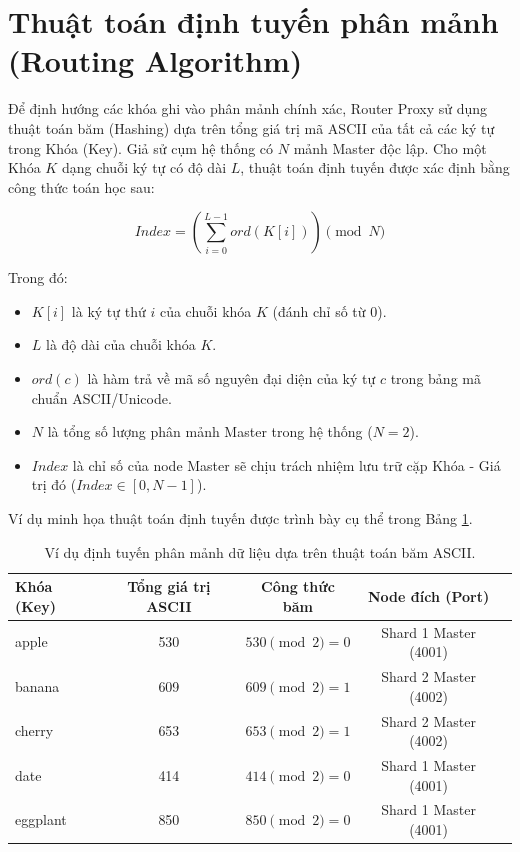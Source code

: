 \documentclass[12pt,a4paper]{report}
\begin{document}
\section{Thuật toán định tuyến phân mảnh (Routing Algorithm)}
Để định hướng các khóa ghi vào phân mảnh chính xác, Router Proxy sử dụng thuật toán băm (Hashing) dựa trên tổng giá trị mã ASCII của tất cả các ký tự trong Khóa (Key).
Giả sử cụm hệ thống có $N$ mảnh Master độc lập. Cho một Khóa $K$ dạng chuỗi ký tự có độ dài $L$, thuật toán định tuyến được xác định bằng công thức toán học sau:

\begin{equation}
    Index = \left( \sum_{i=0}^{L-1} ord(K[i]) \right) \pmod{N}
\end{equation}

Trong đó:
\begin{itemize}
    \item $K[i]$ là ký tự thứ $i$ của chuỗi khóa $K$ (đánh chỉ số từ 0).
    \item $L$ là độ dài của chuỗi khóa $K$.
    \item $ord(c)$ là hàm trả về mã số nguyên đại diện của ký tự $c$ trong bảng mã chuẩn ASCII/Unicode.
    \item $N$ là tổng số lượng phân mảnh Master trong hệ thống ($N = 2$).
    \item $Index$ là chỉ số của node Master sẽ chịu trách nhiệm lưu trữ cặp Khóa - Giá trị đó ($Index \in [0, N-1]$).
\end{itemize}

Ví dụ minh họa thuật toán định tuyến được trình bày cụ thể trong Bảng \ref{tab:sharding_example}.

\begin{table}[h]
    \centering
    \caption{Ví dụ định tuyến phân mảnh dữ liệu dựa trên thuật toán băm ASCII.}
    \label{tab:sharding_example}
    \begin{tabular}{lcccc}
        \toprule
        \textbf{Khóa (Key)} & \textbf{Tổng giá trị ASCII} & \textbf{Công thức băm} & \textbf{Node đích (Port)} \\
        \midrule
        apple & 530 & $530 \pmod{2} = 0$ & Shard 1 Master (4001) \\
        banana & 609 & $609 \pmod{2} = 1$ & Shard 2 Master (4002) \\
        cherry & 653 & $653 \pmod{2} = 1$ & Shard 2 Master (4002) \\
        date & 414 & $414 \pmod{2} = 0$ & Shard 1 Master (4001) \\
        eggplant & 850 & $850 \pmod{2} = 0$ & Shard 1 Master (4001) \\
        \bottomrule
    \end{tabular}
\end{table}
\end{document}
